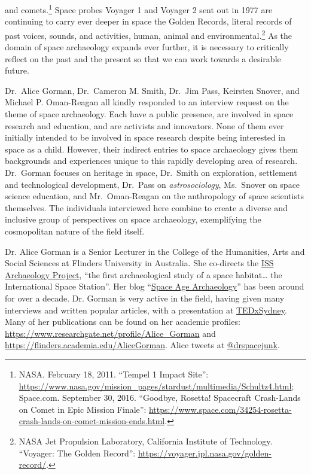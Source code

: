 and comets.\footnote{NASA. February 18, 2011. “Tempel 1 Impact Site”: \url{https://www.nasa.gov/mission_pages/stardust/multimedia/Schultz4.html};
 Space.com. September 30, 2016. “Goodbye, Rosetta! Spacecraft Crash-Lands on Comet in Epic Mission Finale”: \url{https://www.space.com/34254-rosetta-crash-lands-on-comet-mission-ends.html}.}
Space probes Voyager 1 and Voyager 2 sent out in 1977 are continuing to carry ever deeper in space the Golden Records, literal records of past voices, sounds, and activities, human, animal and environmental.\footnote{NASA Jet Propulsion Laboratory, California Institute of Technology. “Voyager: The Golden Record”: \url{https://voyager.jpl.nasa.gov/golden-record/}.}
As the domain of space archaeology expands ever further, it is necessary to critically reflect on the past and the present so that we can work towards a desirable future.

Dr.~Alice Gorman, Dr.~Cameron M. Smith, Dr.~Jim Pass, Keirsten Snover, and Michael P. Oman-Reagan all kindly responded to an interview request on the theme of space archaeology. Each have a public presence, are involved in space research and education, and are activists and innovators. None of them ever initially intended to be involved in space research despite being interested in space as a child. However, their indirect entries to space archaeology gives them backgrounds and experiences unique to this rapidly developing area of research. Dr.~Gorman focuses on heritage in space, Dr.~Smith on exploration, settlement and technological development, Dr.~Pass on \emph{astrosociology}, Ms.~Snover on space science education, and Mr.~Oman-Reagan on the anthropology of space scientists themselves. The individuals interviewed here combine to create a diverse and inclusive group of perspectives on space archaeology, exemplifying the cosmopolitan nature of the field itself.


Dr. Alice Gorman is a Senior Lecturer in the College of the Humanities, Arts and Social Sciences at Flinders University in Australia.
She co-directs the \href{https://issarchaeology.org}{ISS Archaeology Project}, “the first archaeological study of a space habitat… the International Space Station”.
Her blog “\href{https://zoharesque.blogspot.ca}{Space Age Archaeology}” has been around for over a decade. Dr. Gorman is very active in the field, having given many interviews and written popular articles, with a presentation at
\href{https://www.youtube.com/watch?v=x5fn-iycWBs}{TEDxSydney}.
Many of her publications can be found on her academic profiles: \href{https://www.researchgate.net/profile/Alice_Gorman}{https://www.researchgate.net/profile/Alice\_Gorman} and \href{https://flinders.academia.edu/AliceGorman}{https://flinders.academia.edu/AliceGorman}. Alice tweets at \href{<twitter.com/drspacejunk>}{@drspacejunk}.

